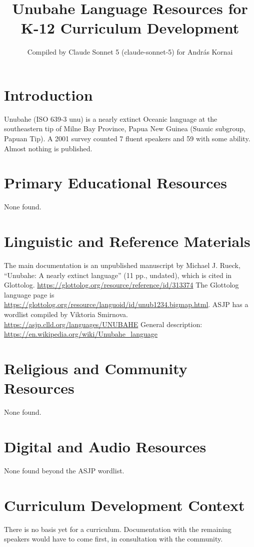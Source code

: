 \documentclass[12pt]{article}
\title{Unubahe Language Resources for K-12 Curriculum Development}
\author{Compiled by Claude Sonnet 5 (claude-sonnet-5) for Andr\'as Kornai}
\date{}
\begin{document}
\maketitle
\section{Introduction}
Unubahe (ISO 639-3 unu) is a nearly extinct Oceanic language at the southeastern tip of Milne Bay Province, Papua New Guinea (Suauic subgroup, Papuan Tip). A 2001 survey counted 7 fluent speakers and 59 with some ability. Almost nothing is published.
\section{Primary Educational Resources}
None found.
\section{Linguistic and Reference Materials}
The main documentation is an unpublished manuscript by Michael J. Rueck, ``Unubahe: A nearly extinct language'' (11 pp., undated), which is cited in Glottolog. \url{https://glottolog.org/resource/reference/id/313374} The Glottolog language page is \url{https://glottolog.org/resource/languoid/id/unub1234.bigmap.html}. ASJP has a wordlist compiled by Viktoria Smirnova. \url{https://asjp.clld.org/languages/UNUBAHE} General description: \url{https://en.wikipedia.org/wiki/Unubahe_language}
\section{Religious and Community Resources}
None found.
\section{Digital and Audio Resources}
None found beyond the ASJP wordlist.
\section{Curriculum Development Context}
There is no basis yet for a curriculum. Documentation with the remaining speakers would have to come first, in consultation with the community.
\end{document}

